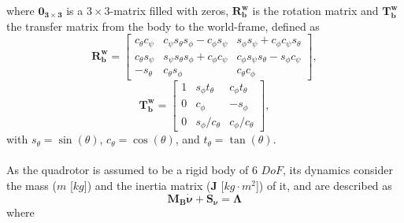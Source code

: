 where $\mathbf{0_{3\times 3}}$ is a $3\times 3$-matrix filled with zeros, $\mathbf{R_{b}^{w}}$ is the rotation matrix and $\mathbf{T_{b}^{w}}$ the transfer matrix from the body to the world-frame, defined as
\begin{equation}
\mathbf{R_{b}^{w}} = \begin{bmatrix}
c_\theta c_\psi & c_\psi s_\theta s_\phi-c_\phi s_\psi & s_\phi s_\psi+c_\phi c_\psi s_\theta\\
c_\theta s_\psi & s_\psi s_\theta s_\phi+c_\phi c_\psi & c_\phi s_\psi s_\theta - s_\phi c_\psi\\
-s_\theta & c_\theta s_\phi & c_\theta c_\phi
\end{bmatrix},
\end{equation}
\begin{equation}
\mathbf{T_{b}^{w}} = \begin{bmatrix}
1 & s_\phi t_\theta & c_\phi t_\theta\\
0 & c_\phi & -s_\phi\\
0 & s_\phi / c_\theta & c_\phi / c_\theta 
\end{bmatrix},
\end{equation}
with $s_\theta = \sin(\theta)$, $c_\theta = \cos(\theta)$, and $t_\theta = \tan(\theta)$.
\\\\
As the quadrotor is assumed to be a rigid body of 6 $DoF$, its dynamics consider the mass ($m$ [$kg$]) and the inertia matrix ($\mathbf{J}$ [$kg\cdot m^{2}$]) of it, and are described as
\begin{equation}
\label{eqn:eomNewtonEuler}
\mathbf{M_{B}}\mathbf{\dot{\nu}} + \mathbf{S_\nu} = \mathbf{\Lambda}
\end{equation}
where
